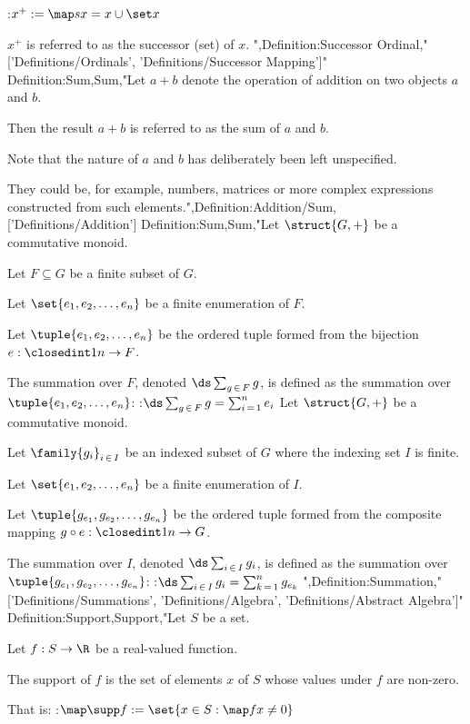 :$x^+ := \map s x = x \cup \set x$

$x^+$ is referred to as the successor (set) of $x$.
",Definition:Successor Ordinal,"['Definitions/Ordinals', 'Definitions/Successor Mapping']"
Definition:Sum,Sum,"Let $a + b$ denote the operation of addition on two objects $a$ and $b$.

Then the result $a + b$ is referred to as the sum of $a$ and $b$.


Note that the nature of $a$ and $b$ has deliberately been left unspecified.

They could be, for example, numbers, matrices or more complex expressions constructed from such elements.",Definition:Addition/Sum,['Definitions/Addition']
Definition:Sum,Sum,"Let $\struct {G, +}$ be a commutative monoid.


Let $F \subseteq G$ be a finite subset of $G$.


Let $\set {e_1, e_2, \ldots, e_n}$ be a finite enumeration of $F$.

Let $\tuple {e_1, e_2, \ldots, e_n}$ be the ordered tuple formed from the bijection $e: \closedint 1 n \to F$.


The summation over $F$, denoted $\ds \sum_{g \mathop \in F} g$, is defined as the summation over $\tuple{e_1, e_2, \ldots, e_n}$:
:$\ds \sum_{g \mathop \in F} g = \sum_{i \mathop = 1}^n e_i$
Let $\struct {G, +}$ be a commutative monoid.


Let $\family {g_i}_{i \mathop \in I}$ be an indexed subset of $G$ where the indexing set $I$ is finite.


Let $\set {e_1, e_2, \ldots, e_n}$ be a finite enumeration of $I$.

Let $\tuple {g_{e_1}, g_{e_2}, \ldots, g_{e_n} }$ be the ordered tuple formed from the composite mapping $g \circ e: \closedint 1 n \to G$.


The summation over $I$, denoted $\ds \sum_{i \mathop \in I} g_i$, is defined as the summation over $\tuple {g_{e_1}, g_{e_2}, \ldots, g_{e_n} }$:
:$\ds \sum_{i \mathop \in I} g_i = \sum_{k \mathop = 1}^n g_{e_k}$
",Definition:Summation,"['Definitions/Summations', 'Definitions/Algebra', 'Definitions/Abstract Algebra']"
Definition:Support,Support,"Let $S$ be a set.

Let $f: S \to \R$ be a real-valued function.


The support of $f$ is the set of elements $x$ of $S$ whose values under $f$ are non-zero.

That is:
:$\map \supp f := \set {x \in S: \map f x \ne 0}$


